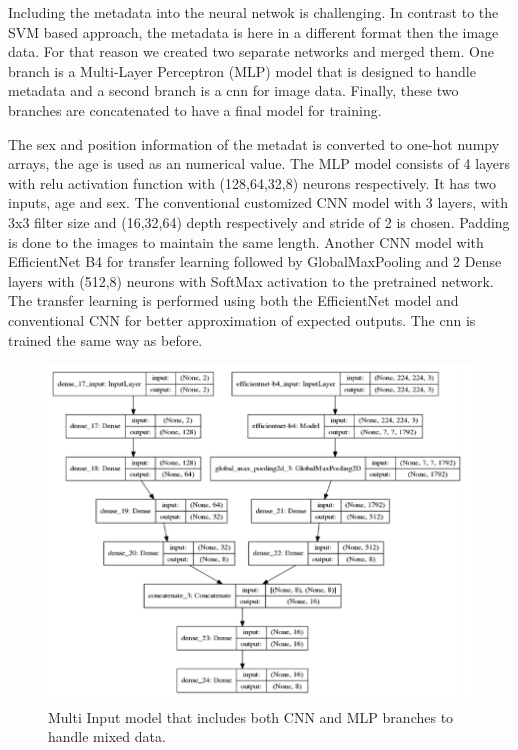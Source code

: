 
Including the metadata into the neural netwok is challenging. In contrast to the SVM based approach, the metadata is here in a different format then the image data. For that reason we created two separate networks and merged them. One branch is a Multi-Layer Perceptron (MLP) model that is designed to handle metadata and a second branch is a cnn for image data. Finally, these two branches are concatenated to have a final model for training.

The sex and position information of the metadat is converted to one-hot numpy arrays, the age is used as an numerical value. The MLP model consists of 4 layers with relu activation function with (128,64,32,8) neurons respectively. It has two inputs, age and sex. 
The conventional customized CNN model with 3 layers, with 3x3 filter size and (16,32,64) depth respectively and stride of 2 is chosen. Padding is done to the images to maintain the same length. Another CNN model with EfficientNet B4 for transfer learning followed by GlobalMaxPooling and 2 Dense layers with (512,8) neurons with SoftMax activation to the pretrained network. The transfer learning is performed using both the EfficientNet model and conventional CNN for better approximation of expected outputs. The cnn is trained the same way as before. 

\begin{figure}[h]
    \centering
    \includegraphics[width=.75\linewidth]{pictures/model.PNG}  
    \caption{Multi \- Input model that includes both CNN and MLP branches to handle mixed data.}
    \label{fig:model}
\end{figure}

